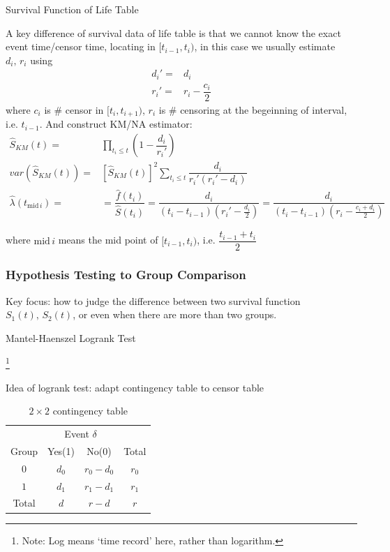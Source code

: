 \begin{point}
    Survival Function of Life Table
\end{point}

A key difference of survival data of life table is that we cannot know the exact event time/censor time, locating in $ [t_{i-1},t_i) $, in this case we usually estimate $ d_i,\,r_i $ using
\begin{align}
    d_i'=&d_i\\
    r_i'=&r_i-\dfrac{c_i}{2}
\end{align}
where $ c_i $ is \# censor in $ [t_i,t_{i+1}) $, $ r_i $ is \# censoring at the begeinning of interval, i.e. $ t_{i-1} $. And construct KM/NA estimator:
\begin{align}
    \hat{S}_{KM}(t)=&\prod_{t_i\leq t}\left( 1-\dfrac{d_i}{r_i'} \right)\\
    var(\hat{S}_{KM}(t))=&\left[\hat{S}_{KM}(t)\right]^2\sum_{t_i\leq t}\dfrac{d_i}{r_i'(r_i'-d_i)}\\
    \hat{\lambda }(t_{\mathrm{mid\,}i })=&=\dfrac{\hat{f}(t_i)}{\hat{S}(t_i)}= \dfrac{d_i}{(t_{i}-t_{i-1})(r_i'-\frac{d_i}{2})}=\dfrac{d_i}{(t_{i}-t_{i-1})(r_i-\frac{c_i+d_i}{2})}
\end{align}

    where $ \mathrm{mid}\,i  $ means the mid point of $ [t_{i-1},t_{i}) $, i.e. $ \dfrac{t_{i-1}+t_{i}}{2} $


\subsubsection{Hypothesis Testing to Group Comparison}
Key focus: how to judge the difference between two survival function $ S_1(t),\,S_2(t) $, or even when there are more than two groups.

\begin{point}
    Mantel-Haenszel Logrank Test
\end{point}\footnote{Note: Log means `time record' here, rather than logarithm.}

Idea of logrank test: adapt contingency table to censor table
\begin{table}[H]
    \centering
    \renewcommand\arraystretch{1}
    \caption{$ 2\times 2 $ contingency table}
    \begin{tabular}{cccc}
        \hline
        \hline
        &\multicolumn{2}{c}{Event $ \delta  $}&\\
        \cline{2-3}
        Group&Yes(1)&No(0)&Total\\
        \hline
        $ 0 $&$ d_0 $&$ r_0-d_0 $&$ r_0 $\\
        $ 1 $&$ d_1 $&$ r_1-d_1 $&$ r_1 $\\
        \hline
        Total&$ d $&$ r-d $&$ r $\\
        \hline
        \hline
    \end{tabular}
    \label{}
\end{table}

